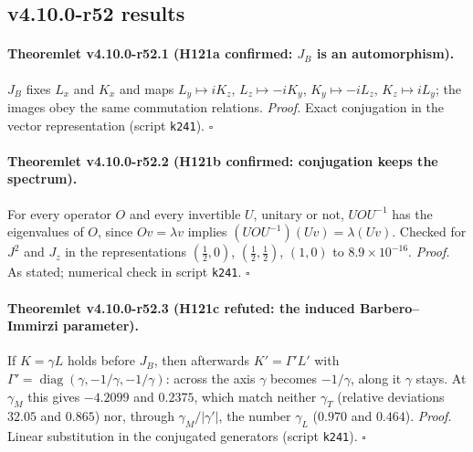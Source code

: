 \subsection*{v4.10.0-r52 results}
\label{subsec:v4100-r52-results}

\paragraph{Theoremlet v4.10.0-r52.1 (H121a confirmed: \(J_B\) is an automorphism).}
\(J_B\) fixes \(L_x\) and \(K_x\) and maps \(L_y\mapsto iK_z\), \(L_z\mapsto-iK_y\), \(K_y\mapsto-iL_z\), \(K_z\mapsto iL_y\); the images obey the same commutation relations.
\emph{Proof.} Exact conjugation in the vector representation (script \texttt{k241}).  \(\square\)

\paragraph{Theoremlet v4.10.0-r52.2 (H121b confirmed: conjugation keeps the spectrum).}
For every operator \(O\) and every invertible \(U\), unitary or not, \(UOU^{-1}\) has the eigenvalues of \(O\), since \(Ov=\lambda v\) implies \((UOU^{-1})(Uv)=\lambda(Uv)\).  Checked for \(J^2\) and
\(J_z\) in the representations \((\tfrac12,0)\), \((\tfrac12,\tfrac12)\), \((1,0)\) to \(8.9\times10^{-16}\).
\emph{Proof.} As stated; numerical check in script \texttt{k241}.  \(\square\)

\paragraph{Theoremlet v4.10.0-r52.3 (H121c refuted: the induced Barbero--Immirzi parameter).}
If \(K=\gamma L\) holds before \(J_B\), then afterwards \(K'=\Gamma'L'\) with \(\Gamma'=\operatorname{diag}(\gamma,-1/\gamma,-1/\gamma)\): across the axis \(\gamma\) becomes \(-1/\gamma\), along it \(\gamma\) stays.  At \(\gamma_M\) this
gives \(-4.2099\) and \(0.2375\), which match neither \(\gamma_T\) (relative deviations \(32.05\) and \(0.865\)) nor, through \(\gamma_M/|\gamma'|\), the number \(\gamma_L\) (\(0.970\) and \(0.464\)).
\emph{Proof.} Linear substitution in the conjugated generators (script \texttt{k241}).  \(\square\)

